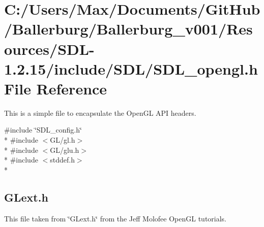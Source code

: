 \section{C\+:/\+Users/\+Max/\+Documents/\+Git\+Hub/\+Ballerburg/\+Ballerburg\+\_\+v001/\+Resources/\+S\+D\+L-\/1.2.15/include/\+S\+D\+L/\+S\+D\+L\+\_\+opengl.h File Reference}
\label{_s_d_l__opengl_8h}


This is a simple file to encapsulate the Open\+G\+L A\+P\+I headers.  


{\ttfamily \#include \char`\"{}S\+D\+L\+\_\+config.\+h\char`\"{}}\\*
{\ttfamily \#include $<$G\+L/gl.\+h$>$}\\*
{\ttfamily \#include $<$G\+L/glu.\+h$>$}\\*
{\ttfamily \#include $<$stddef.\+h$>$}\\*
\subsection*{G\+Lext.\+h}
\label{_amgrp55d5a26c0121f90ea7b8766a275e1771}%
This file taken from \char`\"{}\+G\+Lext.\+h\char`\"{} from the Jeff Molofee Open\+G\+L tutorials.

